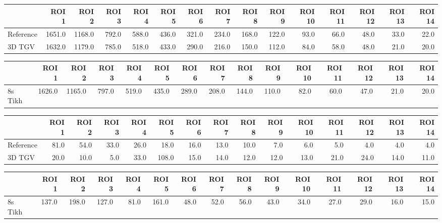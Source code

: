 \begin{tabular}{lrrrrrrrrrrrrrr}
\toprule
{} &   ROI 1 &   ROI 2 &  ROI 3 &  ROI 4 &  ROI 5 &  ROI 6 &  ROI 7 &  ROI 8 &  ROI 9 &  ROI 10 &  ROI 11 &  ROI 12 &  ROI 13 &  ROI 14 \\
\midrule
Reference &  1651.0 &  1168.0 &  792.0 &  588.0 &  436.0 &  321.0 &  234.0 &  168.0 &  122.0 &    93.0 &    66.0 &    48.0 &    33.0 &    22.0 \\
3D TGV    &  1632.0 &  1179.0 &  785.0 &  518.0 &  433.0 &  290.0 &  216.0 &  150.0 &  112.0 &    84.0 &    58.0 &    48.0 &    21.0 &    20.0 \\
\bottomrule
\end{tabular}
\begin{tabular}{lrrrrrrrrrrrrrr}
\toprule
{} &   ROI 1 &   ROI 2 &  ROI 3 &  ROI 4 &  ROI 5 &  ROI 6 &  ROI 7 &  ROI 8 &  ROI 9 &  ROI 10 &  ROI 11 &  ROI 12 &  ROI 13 &  ROI 14 \\
\midrule
8s Tikh &  1626.0 &  1165.0 &  797.0 &  519.0 &  435.0 &  289.0 &  208.0 &  144.0 &  110.0 &    82.0 &    60.0 &    47.0 &    21.0 &    20.0 \\
\bottomrule
\end{tabular}
\begin{tabular}{lrrrrrrrrrrrrrr}
\toprule
{} &  ROI 1 &  ROI 2 &  ROI 3 &  ROI 4 &  ROI 5 &  ROI 6 &  ROI 7 &  ROI 8 &  ROI 9 &  ROI 10 &  ROI 11 &  ROI 12 &  ROI 13 &  ROI 14 \\
\midrule
Reference &   81.0 &   54.0 &   33.0 &   26.0 &   18.0 &   16.0 &   13.0 &   10.0 &    7.0 &     6.0 &     5.0 &     4.0 &     4.0 &     4.0 \\
3D TGV    &   20.0 &   10.0 &    5.0 &   33.0 &  108.0 &   15.0 &   14.0 &   12.0 &   12.0 &    13.0 &    21.0 &    24.0 &    14.0 &    11.0 \\
\bottomrule
\end{tabular}
\begin{tabular}{lrrrrrrrrrrrrrr}
\toprule
{} &  ROI 1 &  ROI 2 &  ROI 3 &  ROI 4 &  ROI 5 &  ROI 6 &  ROI 7 &  ROI 8 &  ROI 9 &  ROI 10 &  ROI 11 &  ROI 12 &  ROI 13 &  ROI 14 \\
\midrule
8s Tikh &  137.0 &  198.0 &  127.0 &   81.0 &  161.0 &   48.0 &   52.0 &   56.0 &   43.0 &    34.0 &    27.0 &    29.0 &    16.0 &    15.0 \\
\bottomrule
\end{tabular}
